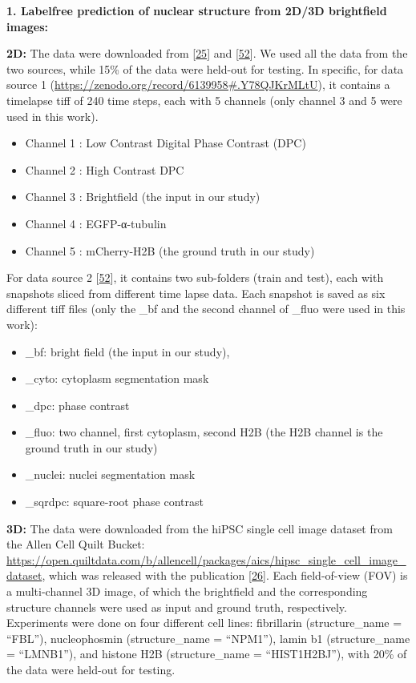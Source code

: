 \textbf{1. Labelfree prediction of nuclear structure from 2D/3D brightfield images:}

\textbf{2D:} The data were downloaded from {[}\protect\hyperlink{ref-xv2VIyRP}{25}{]} and {[}\protect\hyperlink{ref-8ywSgqrJ}{52}{]}. We used all the data from the two sources, while 15\% of the data were held-out for testing. In specific, for data source 1 (\url{https://zenodo.org/record/6139958\#.Y78QJKrMLtU}), it contains a timelapse tiff of 240 time steps, each with 5 channels (only channel 3 and 5 were used in this work).

\begin{itemize}
\tightlist
\item
  Channel 1 : Low Contrast Digital Phase Contrast (DPC)
\item
  Channel 2 : High Contrast DPC
\item
  Channel 3 : Brightfield (the input in our study)
\item
  Channel 4 : EGFP-α-tubulin
\item
  Channel 5 : mCherry-H2B (the ground truth in our study)
\end{itemize}

For data source 2 {[}\protect\hyperlink{ref-8ywSgqrJ}{52}{]}, it contains two sub-folders (train and test), each with snapshots sliced from different time lapse data. Each snapshot is saved as six different tiff files (only the \_bf and the second channel of \_fluo were used in this work):

\begin{itemize}
\tightlist
\item
  \_bf: bright field (the input in our study),
\item
  \_cyto: cytoplasm segmentation mask
\item
  \_dpc: phase contrast
\item
  \_fluo: two channel, first cytoplasm, second H2B (the H2B channel is the ground truth in our study)
\item
  \_nuclei: nuclei segmentation mask
\item
  \_sqrdpc: square-root phase contrast
\end{itemize}

\textbf{3D:} The data were downloaded from the hiPSC single cell image dataset from the Allen Cell Quilt Bucket: \url{https://open.quiltdata.com/b/allencell/packages/aics/hipsc_single_cell_image_dataset}, which was released with the publication {[}\protect\hyperlink{ref-5sGcmDuy}{26}{]}. Each field-of-view (FOV) is a multi-channel 3D image, of which the brightfield and the corresponding structure channels were used as input and ground truth, respectively. Experiments were done on four different cell lines: fibrillarin (structure\_name = ``FBL''), nucleophosmin (structure\_name = ``NPM1''), lamin b1 (structure\_name = ``LMNB1''), and histone H2B (structure\_name = ``HIST1H2BJ''), with 20\% of the data were held-out for testing.

